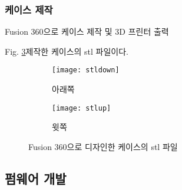 \subsubsection{케이스 제작}

Fusion 360으로 케이스 제작 및 3D 프린터 출력


Fig. \ref{fig:stl}\은 제작한 케이스의 stl 파일이다. 

\begin{figure}[h]
	\begin{center}
		\begin{subfigure}{0.45\textwidth}
			\texttt{[image: stldown]} 
			\caption{아래쪽}
			\label{fig:stldown}
		\end{subfigure}
		\begin{subfigure}{0.45\textwidth}
			\texttt{[image: stlup]}
			\caption{윗쪽}
			\label{fig:stlup}
		\end{subfigure}
		\caption{Fusion 360으로 디자인한 케이스의 stl 파일}
		\label{fig:stl}
	\end{center}
\end{figure}




\subsection{펌웨어 개발}

